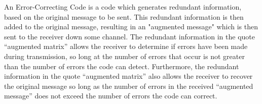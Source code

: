 \documentclass[ClusteringConnectionsMAIN.tex]{subfiles}
\begin{document}
  An Error-Correcting Code is a code which generates redundant information, based on the original message to be sent.  This redundant information is then added to the original message, resulting in an "augmented message" which is then sent to the receiver down some channel.  The redundant information in the quote “augmented matrix” allows the receiver to determine if errors have been made during transmission, so long at the number of errors that occur is not greater than the number of errors the code can detect.  Furthermore, the redundant information in the quote “augmented matrix” also allows the receiver to recover the original message so long as the number of errors in the received “augmented message” does not exceed the number of errors the code can correct.  
\end{document}
